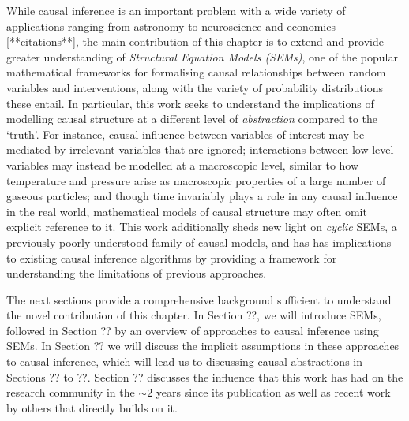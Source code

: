 While causal inference is an important problem with a wide variety of applications ranging from astronomy to neuroscience and economics [**citations**], the main contribution of this chapter is to extend and provide greater understanding of \emph{Structural Equation Models (SEMs)}, one of the popular mathematical frameworks for formalising causal relationships between random variables and interventions, along with the variety of probability distributions these entail. 
In particular, this work seeks to understand the implications of modelling causal structure at a different level of \emph{abstraction} compared to the `truth'. For instance, causal influence between variables of interest may be mediated by irrelevant variables that are ignored; interactions between low-level variables may instead be modelled at a macroscopic level, similar to how temperature and pressure arise as macroscopic properties of a large number of gaseous particles; and though time invariably plays a role in any causal influence in the real world, mathematical models of causal structure may often omit explicit reference to it.
This work additionally sheds new light on \emph{cyclic} SEMs, a previously poorly understood family of causal models, and has has implications to existing causal inference algorithms by providing a framework for understanding the limitations of previous approaches.


The next sections provide a comprehensive background sufficient to understand the novel contribution of this chapter.
In Section ??, we will introduce SEMs, followed in Section ?? by an overview of approaches to causal inference using SEMs. 
In Section ?? we will discuss the implicit assumptions in these approaches to causal inference, which will lead us to discussing causal abstractions in Sections ?? to ??.
Section ?? discusses the influence that this work has had on the research community in the $\sim 2$ years since its publication as well as recent work by others that directly builds on it.






